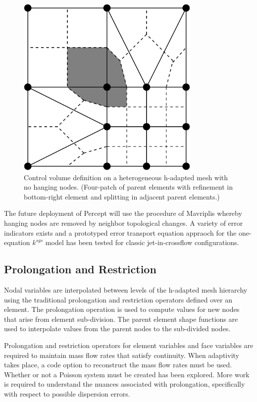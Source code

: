 \begin{figure}[h]
  \centerline{\includegraphics[width=3.5in]{images/hadapt3.pdf}}
  \vspace{0.25in}
  \caption{Control volume definition on a heterogeneous
           h-adapted mesh with no hanging nodes.
           (Four-patch of parent elements 
           with refinement in bottom-right element
           and splitting in adjacent parent elements.) }
  \label{kallin-convol}
\end{figure}

The future deployment of Percept will use the procedure of Mavriplis whereby hanging 
nodes are removed by neighbor topological changes. A variety of error indicators exists 
and a prototyped error transport equation appraoch for the one-equation $k^{sgs}$ model 
has been tested for classic jet-in-crossflow configurations.

\subsection{Prolongation and Restriction}

Nodal variables are interpolated between levels of the
h-adapted mesh hierarchy using the traditional prolongation
and restriction operators defined over an element.  The
prolongation operation is used to compute values for new
nodes that arise from element sub-division.  The parent element
shape functions are used to interpolate values from the parent
nodes to the sub-divided nodes.

Prolongation and restriction operators for element variables and 
face variables are required to maintain mass flow rates that
satisfy continuity. When adaptivity takes place, a code option
to reconstruct the mass flow rates must be used. Whether or not
a Poisson system must be created has been explored. More work is 
required to understand the nuances associated with prolongation, 
specifically with respect to possible dispersion errors.
